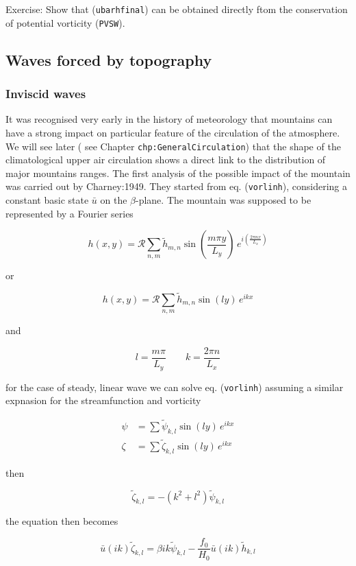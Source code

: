 Exercise: Show that (\texttt{ubarhfinal}) can be obtained directly ftom
the conservation of potential vorticity (\texttt{PVSW}).

\subsection{Waves forced by
topography}\label{waves-forced-by-topography}

\subsubsection{Inviscid waves}\label{inviscid-waves}

It was recognised very early in the history of meteorology that
mountains can have a strong impact on particular feature of the
circulation of the atmosphere. We will see later ( see Chapter
\texttt{chp:GeneralCirculation}) that the shape of the climatological
upper air circulation shows a direct link to the distribution of major
mountains ranges. The first analysis of the possible impact of the
mountain was carried out by Charney:1949. They started from eq.
(\texttt{vorlinh}), considering a constant basic state \(\bar{u}\) on
the \(\beta\)-plane. The mountain was supposed to be represented by a
Fourier series

\[h(x,y) = \mathcal{R} \sum_{n,m} \tilde{h}_{m,n} \sin\left(\frac{ m \pi y}{L_y}\right) \,e^{i\left(\frac{2\pi n x}{L_x}\right)}\]

or

\[h(x,y) = \mathcal{R} \sum_{n,m} \tilde{h}_{m,n} \sin(l y) \,e^{i k x}\]

and

\[l = \frac{ m \pi}{L_y} \qquad k=\frac{2\pi n}{L_x}\]

for the case of steady, linear wave we can solve eq. (\texttt{vorlinh})
assuming a similar expnasion for the streamfunction and vorticity

\[\begin{aligned}
\psi &= \sum \tilde{\psi}_{k,l}\sin(l y) \,e^{i k x} \\
\zeta &= \sum \tilde{\zeta}_{k,l}\sin(l y) \,e^{i k x}
\end{aligned}\]

then

\[\tilde{\zeta}_{k,l} = -(k^2+l^2) \tilde{\psi}_{k,l}\]

the equation then becomes

\[\bar{u}(ik) \tilde{\zeta}_{k,l} = \beta ik\tilde{\psi}_{k,l} -\frac{f_0}{H_0}\bar{u}(i k )\tilde{h}_{k,l}\]

